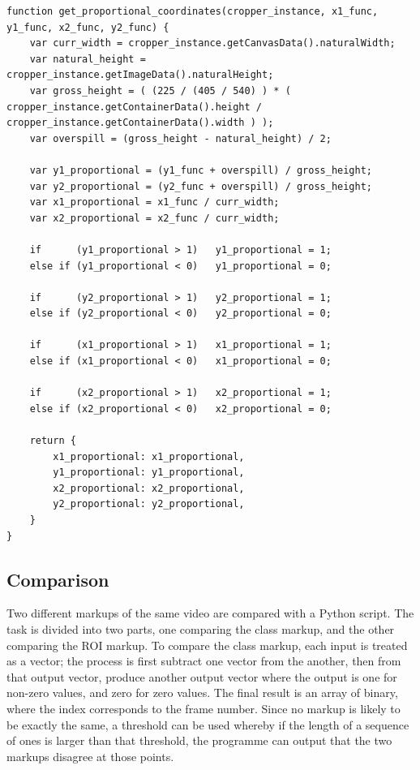             \begin{lstlisting}[style=JSStyle]
function get_proportional_coordinates(cropper_instance, x1_func, y1_func, x2_func, y2_func) {
    var curr_width = cropper_instance.getCanvasData().naturalWidth;
    var natural_height = cropper_instance.getImageData().naturalHeight;
    var gross_height = ( (225 / (405 / 540) ) * ( cropper_instance.getContainerData().height / cropper_instance.getContainerData().width ) );
    var overspill = (gross_height - natural_height) / 2;

    var y1_proportional = (y1_func + overspill) / gross_height;
    var y2_proportional = (y2_func + overspill) / gross_height;
    var x1_proportional = x1_func / curr_width;
    var x2_proportional = x2_func / curr_width;

    if      (y1_proportional > 1)   y1_proportional = 1;
    else if (y1_proportional < 0)   y1_proportional = 0;

    if      (y2_proportional > 1)   y2_proportional = 1;
    else if (y2_proportional < 0)   y2_proportional = 0;

    if      (x1_proportional > 1)   x1_proportional = 1;
    else if (x1_proportional < 0)   x1_proportional = 0;

    if      (x2_proportional > 1)   x2_proportional = 1;
    else if (x2_proportional < 0)   x2_proportional = 0;

    return {
        x1_proportional: x1_proportional,
        y1_proportional: y1_proportional,
        x2_proportional: x2_proportional,
        y2_proportional: y2_proportional,
    }
}\end{lstlisting} 

    \subsection{Comparison}
    Two different markups of the same video are compared with a Python script. The task is divided into two parts, one comparing the class markup, and the other comparing the ROI markup.  To compare the class markup, each input is treated as a vector; the process is first subtract one vector from the another, then from that output vector, produce another output vector where the output is one for non-zero values, and zero for zero values. The final result is an array of binary, where the index corresponds to the frame number. Since no markup is likely to be exactly the same, a threshold can be used whereby if the length of a sequence of ones is larger than that threshold, the programme can output that the two markups disagree at those points.
    
